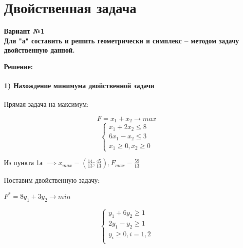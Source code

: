 \chapter{Двойственная задача}

{\bf Вариант №1\\ Для "а" составить и решить геометрически и симплекс – методом задачу двойственную данной.}

\begin{center}
    {\bf
    Решение:}
\end{center}

\subsubsection{1) Нахождение минимума двойственной задачи}

\begin{flushleft}
Прямая задача на максимум:
\end{flushleft}

\begin{equation*}
    F = x_1 + x_2 \rightarrow max
\end{equation*}
\begin{equation*}
    \begin{cases}
        x_1 + 2x_2 \le 8 \\
        6x_1 - x_2 \le 3 \\
        x_1 \ge 0, x_2 \ge 0
    \end{cases}
\end{equation*}

\begin{flushleft}
Из пункта 1а $\implies x_{max} = (\frac{14}{13}; \frac{45}{13}), F_{max} = \frac{59}{13}$
\end{flushleft}

\begin{flushleft}
Поставим двойственную задачу:
\end{flushleft}

\begin{center}
    $F^{*} = 8y_1 + 3y_2 \rightarrow min$
\end{center}
\begin{equation*}
    \begin{cases}
        y_1 + 6y_2 \ge 1\\
        2y_1 - y_2 \ge 1\\
        y_i \ge 0, i = 1, 2\\
    \end{cases}
\end{equation*}

